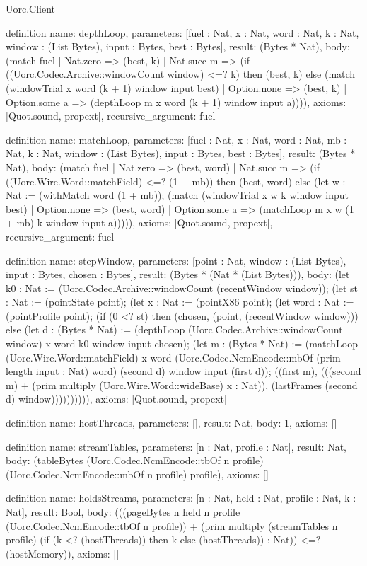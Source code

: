 \begin{lexlean}{Uorc.Client}
\begin{semanticmodule}
definition{
  name: depthLoop,
  parameters: [fuel : Nat, x : Nat, word : Nat, k : Nat, window : (List Bytes), input : Bytes, best : Bytes],
  result: (Bytes * Nat),
  body: (match fuel
    | Nat.zero => (best, k)
    | Nat.succ m => (if ((Uorc.Codec.Archive::windowCount window) <=? k) then (best, k) else (match (windowTrial x word (k + 1) window input best)
      | Option.none => (best, k)
      | Option.some a => (depthLoop m x word (k + 1) window input a)))),
  axioms: [Quot.sound, propext],
  recursive_argument: fuel
}

definition{
  name: matchLoop,
  parameters: [fuel : Nat, x : Nat, word : Nat, mb : Nat, k : Nat, window : (List Bytes), input : Bytes, best : Bytes],
  result: (Bytes * Nat),
  body: (match fuel
    | Nat.zero => (best, word)
    | Nat.succ m => (if ((Uorc.Wire.Word::matchField) <=? (1 + mb)) then (best, word) else (let w : Nat := (withMatch word (1 + mb)); (match (windowTrial x w k window input best)
      | Option.none => (best, word)
      | Option.some a => (matchLoop m x w (1 + mb) k window input a))))),
  axioms: [Quot.sound, propext],
  recursive_argument: fuel
}

definition{
  name: stepWindow,
  parameters: [point : Nat, window : (List Bytes), input : Bytes, chosen : Bytes],
  result: (Bytes * (Nat * (List Bytes))),
  body: (let k0 : Nat := (Uorc.Codec.Archive::windowCount (recentWindow window)); (let st : Nat := (pointState point); (let x : Nat := (pointX86 point); (let word : Nat := (pointProfile point); (if (0 <? st) then (chosen, (point, (recentWindow window))) else (let d : (Bytes * Nat) := (depthLoop (Uorc.Codec.Archive::windowCount window) x word k0 window input chosen); (let m : (Bytes * Nat) := (matchLoop (Uorc.Wire.Word::matchField) x word (Uorc.Codec.NcmEncode::mbOf (prim length input : Nat) word) (second d) window input (first d)); ((first m), (((second m) + (prim multiply (Uorc.Wire.Word::wideBase) x : Nat)), (lastFrames (second d) window)))))))))),
  axioms: [Quot.sound, propext]
}

definition{
  name: hostThreads,
  parameters: [],
  result: Nat,
  body: 1,
  axioms: []
}

definition{
  name: streamTables,
  parameters: [n : Nat, profile : Nat],
  result: Nat,
  body: (tableBytes (Uorc.Codec.NcmEncode::tbOf n profile) (Uorc.Codec.NcmEncode::mbOf n profile) profile),
  axioms: []
}

definition{
  name: holdsStreams,
  parameters: [n : Nat, held : Nat, profile : Nat, k : Nat],
  result: Bool,
  body: (((pageBytes n held n profile (Uorc.Codec.NcmEncode::tbOf n profile)) + (prim multiply (streamTables n profile) (if (k <? (hostThreads)) then k else (hostThreads)) : Nat)) <=? (hostMemory)),
  axioms: []
}


\end{semanticmodule}
\end{lexlean}
